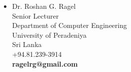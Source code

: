 \documentclass[11pt,a4paper,scan]{moderncv}        %
\begin{document}
\begin{multicols}{2}
\begin{itemize}
		\item Dr. Roshan G. Ragel \\ 	Senior Lecturer \\ Department of Computer Engineering \\ University of Peradeniya \\ Sri Lanka \\ +94.81.239-3914 \\ \textbf{ragelrg@gmail.com} \\
	\end{itemize}
\end{multicols}



%


\end{document}
